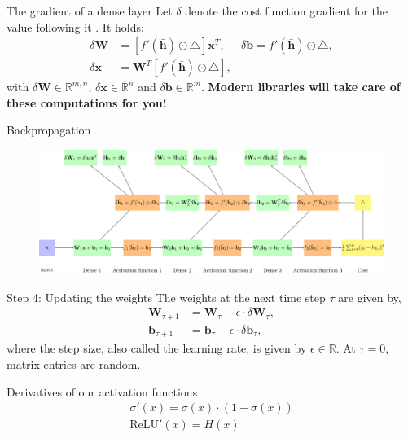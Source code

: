 \documentclass{beamer}
\begin{document}
		\begin{frame}{The gradient of a dense layer}
      Let $\delta$ denote the cost function gradient for the value following it \cite{greff2016lstm}. It holds:
      \begin{align}
        \delta \mathbf{W} &= [f'(\bar{\mathbf{h}}) \odot \triangle]\mathbf{x}^T, &  \delta \mathbf{b} = f'(\bar{\mathbf{h}}) \odot \triangle, \\
        \delta \mathbf{x} &= \mathbf{W}^T [f'(\bar{\mathbf{h}}) \odot \triangle],
      \end{align}
      with $\delta \mathbf{W} \in \mathbb{R}^{m,n}$, $\delta \mathbf{x} \in \mathbb{R}^{n}$ and $\delta \mathbf{b} \in \mathbb{R}^{m}$.
      \textbf{Modern libraries will take care of these computations for you!} \\
    \end{frame}
		\begin{frame}{Backpropagation}
      \begin{figure}
        \includegraphics[width=\linewidth]{./figures/backprop.pdf} 
      \end{figure}
    \end{frame}
		
		\begin{frame}{Step 4: Updating the weights}
		The weights at the next time step $\tau$ are given by,
		\begin{align*}
			\mathbf{W}_{\tau + 1} &= \mathbf{W}_\tau - \epsilon \cdot \delta\mathbf{W}_{\tau}, \\
			\mathbf{b}_{\tau + 1} &= \mathbf{b}_{\tau} - \epsilon \cdot \delta\mathbf{b}_{\tau},
			 \end{align*}
			where the step size, also called the learning rate, is given by $\epsilon \in \mathbb{R}$. At $\tau = 0$, matrix entries are random.
    \end{frame}
%
    \begin{frame}{Derivatives of our activation functions}
      \begin{align}
        \sigma'(x) = \sigma(x) \cdot (1 - \sigma(x)) \\
        \text{ReLU}'(x) = H(x) 
      \end{align}
      \begin{figure}
        
        
      \end{figure}
    \end{frame}
\end{document}

